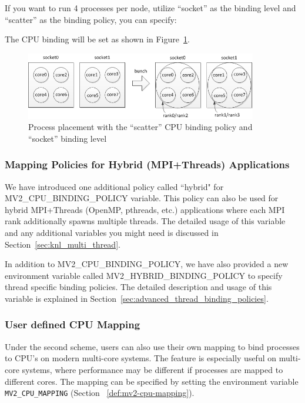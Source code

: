 If you want to run 4 processes per node, utilize ``socket'' as the binding
level and ``scatter'' as the binding policy, you can specify:


The CPU binding will be set as shown in Figure~\ref{fig:socket_scatter}.

\begin{figure}[htbp]
 \centering
 \includegraphics[width=0.9\textwidth]{Img/nehalem-socket-scatter.png}
 \caption{Process placement with the ``scatter'' CPU binding policy and
``socket'' binding level}
 \label{fig:socket_scatter}
\end{figure}


\subsubsection{Mapping Policies for Hybrid (MPI+Threads) Applications}
We have introduced one additional policy called ``hybrid" for
MV2\_CPU\_BINDING\_POLICY variable. This policy can also be used for hybrid
MPI+Threads (OpenMP, pthreads, etc.) applications where each MPI rank
additionally spawns multiple threads. The detailed usage of this variable and
any additional variables you might need is discussed in
Section~\ref{sec:knl_multi_thread}.

In addition to MV2\_CPU\_BINDING\_POLICY, we have also provided a new
environment variable called MV2\_HYBRID\_BINDING\_POLICY to specify thread
specific binding policies. The detailed description and usage of this variable
is explained in Section~\ref{sec:advanced_thread_binding_policies}.

\subsubsection{User defined CPU Mapping}
\label{usage:mv2_cpu_mapping}
Under the second scheme, users can also use
their own mapping to bind processes to  CPU's on modern
multi-core systems.  The feature is especially useful
on multi-core systems, where performance may be different if processes are
mapped to
different cores. The mapping can be specified by setting the environment
variable
\texttt{MV2\_CPU\_MAPPING} (Section ~\ref{def:mv2-cpu-mapping}).

